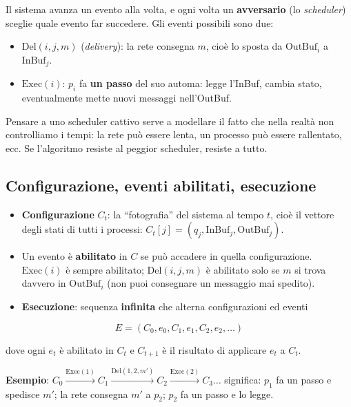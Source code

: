 Il sistema avanza un evento alla volta, e ogni volta un \textbf{avversario} (lo \emph{scheduler}) sceglie quale evento far succedere. Gli eventi possibili sono due:

\begin{itemize}
\tightlist
\item
  \(\text{Del}(i, j, m)\) (\emph{delivery}): la rete consegna \(m\), cioè lo sposta da \(\text{OutBuf}_i\) a \(\text{InBuf}_j\).
\item
  \(\text{Exec}(i)\): \(p_i\) fa \textbf{un passo} del suo automa: legge l'InBuf, cambia stato, eventualmente mette nuovi messaggi nell'OutBuf.
\end{itemize}

Pensare a uno scheduler cattivo serve a modellare il fatto che nella realtà non controlliamo i tempi: la rete può essere lenta, un processo può essere rallentato, ecc. Se l'algoritmo resiste al peggior scheduler, resiste a tutto.

\subsection{Configurazione, eventi abilitati, esecuzione}

\begin{itemize}
\tightlist
\item
  \textbf{Configurazione} \(C_t\): la ``fotografia'' del sistema al tempo \(t\), cioè il vettore degli stati di tutti i processi: \(C_t[j] = (q_j, \text{InBuf}_j, \text{OutBuf}_j)\).
\item
  Un evento è \textbf{abilitato} in \(C\) se può accadere in quella configurazione. \(\text{Exec}(i)\) è sempre abilitato; \(\text{Del}(i,j,m)\) è abilitato solo se \(m\) si trova davvero in \(\text{OutBuf}_i\) (non puoi consegnare un messaggio mai spedito).
\item
  \textbf{Esecuzione}: sequenza \textbf{infinita} che alterna configurazioni ed eventi
\end{itemize}

\[
E = (C_0, e_0, C_1, e_1, C_2, e_2, \dots)
\]

dove ogni \(e_t\) è abilitato in \(C_t\) e \(C_{t+1}\) è il risultato di applicare \(e_t\) a \(C_t\).

\textbf{Esempio}: \(C_0 \xrightarrow{\text{Exec}(1)} C_1 \xrightarrow{\text{Del}(1,2,m')} C_2 \xrightarrow{\text{Exec}(2)} C_3 \dots\) significa: \(p_1\) fa un passo e spedisce \(m'\); la rete consegna \(m'\) a \(p_2\); \(p_2\) fa un passo e lo legge.

